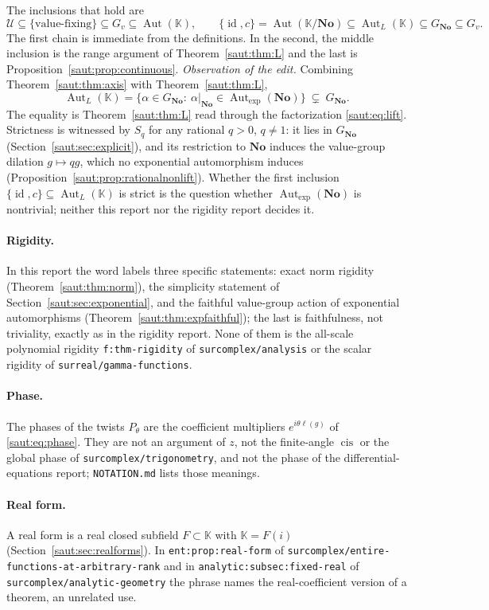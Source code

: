 \documentclass[11pt]{article}
\theoremstyle{definition}
\theoremstyle{remark}
\newcommand{\No}{\mathbf{No}}
\newcommand{\K}{\mathbb K}
\newcommand{\U}{\mathcal U}
\newcommand{\id}{\operatorname{id}}
\newcommand{\Aut}{\operatorname{Aut}}
\newcommand{\Gexp}{\operatorname{Aut}_{\exp}(\No)}
\newcommand{\AutL}{\operatorname{Aut}_{L}}
\newcommand{\repo}[1]{\nolinkurl{#1}}%
\newcommand{\lbl}[1]{\nolinkurl{#1}}%
\numberwithin{equation}{section}
\begin{document}
The inclusions that hold are
\[
 \U\subseteq\{\text{value-fixing}\}\subseteq G_v\subseteq\Aut(\K),
 \qquad
 \{\id,c\}=\Aut(\K/\No)\subseteq\AutL(\K)\subseteq G_{\No}\subseteq G_v .
\]
The first chain is immediate from the definitions. In the second, the
middle inclusion is the range argument of Theorem~\ref{saut:thm:L} and the
last is Proposition~\ref{saut:prop:continuous}.
\emph{Observation of the edit.} Combining Theorem~\ref{saut:thm:axis} with
Theorem~\ref{saut:thm:L},
\begin{equation}\label{saut:eq:Lchain}
 \AutL(\K)=\{\alpha\in G_{\No}:\ \alpha|_{\No}\in\Gexp\}
 \ \subsetneq\ G_{\No}.
\end{equation}
The equality is Theorem~\ref{saut:thm:L} read through the factorization
\eqref{saut:eq:lift}. Strictness is witnessed by $S_q$ for any rational
$q>0$, $q\ne1$: it lies in $G_{\No}$ (Section~\ref{saut:sec:explicit}), and
its restriction to $\No$ induces the value-group dilation $g\mapsto qg$,
which no exponential automorphism induces
(Proposition~\ref{saut:prop:rationalnonlift}). Whether the first inclusion
$\{\id,c\}\subseteq\AutL(\K)$ is strict is the question whether $\Gexp$ is
nontrivial; neither this report nor the rigidity report decides it.

\paragraph{Rigidity.} In this report the word labels three specific
statements: exact norm rigidity (Theorem~\ref{saut:thm:norm}), the
simplicity statement of Section~\ref{saut:sec:exponential}, and the
faithful value-group action of exponential automorphisms
(Theorem~\ref{saut:thm:expfaithful}); the last is faithfulness, not
triviality, exactly as in the rigidity report. None of them is the
all-scale polynomial rigidity \lbl{f:thm-rigidity} of
\repo{surcomplex/analysis} or the scalar rigidity of
\repo{surreal/gamma-functions}.

\paragraph{Phase.} The phases of the twists $P_\theta$ are the coefficient
multipliers $e^{i\theta\ell(g)}$ of \eqref{saut:eq:phase}. They are not an
argument of $z$, not the finite-angle $\operatorname{cis}$ or the global
phase of \repo{surcomplex/trigonometry}, and not the phase of the
differential-equations report; \repo{NOTATION.md} lists those meanings.

\paragraph{Real form.} A real form is a real closed subfield $F\subset\K$
with $\K=F(i)$ (Section~\ref{saut:sec:realforms}). In
\lbl{ent:prop:real-form} of \repo{surcomplex/entire-functions-at-arbitrary-rank}
and in \lbl{analytic:subsec:fixed-real} of \repo{surcomplex/analytic-geometry}
the phrase names the real-coefficient version of a theorem, an unrelated use.
\end{document}
